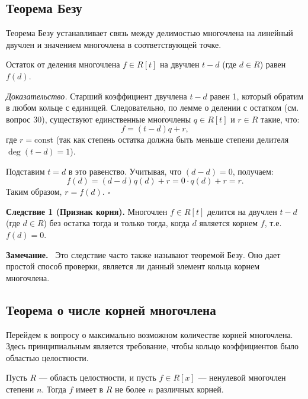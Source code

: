 \documentclass[a4paper,12pt]{article}
\newcommand{\myremark}{\textbf{Замечание.}\ }
\theoremstyle{definition}
\theoremstyle{plain}
\theoremstyle{remark}
\begin{document}
	\subsection{Теорема Безу}
	
	Теорема Безу устанавливает связь между делимостью многочлена на линейный двучлен и значением многочлена в соответствующей точке.
	
	\begin{tcolorbox}[colback=blue!5, colframe=blue!40!black, title=Теорема 1 (Безу)]
		Остаток от деления многочлена \( f \in R[t] \) на двучлен \( t - d \) (где \( d \in R \)) равен \( f(d) \).
	\end{tcolorbox}
	
	\medskip
	\textit{Доказательство.}
	Старший коэффициент двучлена \( t - d \) равен 1, который обратим в любом кольце с единицей. Следовательно, по лемме о делении с остатком (см. вопрос 30), существуют единственные многочлены \( q \in R[t] \) и \( r \in R \) такие, что:
	\[
	f = (t - d) q + r,
	\]
	где \( r = \text{const} \) (так как степень остатка должна быть меньше степени делителя \( \deg(t-d) = 1 \)).
	
	Подставим \( t = d \) в это равенство. Учитывая, что \( (d - d) = 0 \), получаем:
	\[
	f(d) = (d - d) q(d) + r = 0 \cdot q(d) + r = r.
	\]
	Таким образом, \( r = f(d) \). \hfill \(\square\)
	
	\medskip
	\noindent \textbf{Следствие 1 (Признак корня).}
	Многочлен \( f \in R[t] \) делится на двучлен \( t - d \) (где \( d \in R \)) без остатка тогда и только тогда, когда \( d \) является корнем \( f \), т.е. \( f(d) = 0 \).
	
	\myremark
	Это следствие часто также называют теоремой Безу. Оно дает простой способ проверки, является ли данный элемент кольца корнем многочлена.
	
	\subsection{Теорема о числе корней многочлена}
	
	Перейдем к вопросу о максимально возможном количестве корней многочлена. Здесь принципиальным является требование, чтобы кольцо коэффициентов было областью целостности.
	
	\begin{tcolorbox}[colback=green!5, colframe=green!50!black, title=Теорема 2 (о числе корней)]
		Пусть \( R \) — область целостности, и пусть \( f \in R[x] \) — ненулевой многочлен степени \( n \). Тогда \( f \) имеет в \( R \) не более \( n \) различных корней.
	\end{tcolorbox}
	
\end{document}
